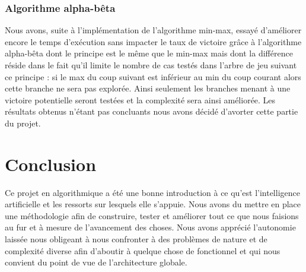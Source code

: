 \documentclass{report}
\begin{document}
\subsection{Algorithme alpha-bêta} \label{alphabeta}
Nous avons, suite à l'implémentation de l'algorithme min-max, essayé d'améliorer encore le temps d'exécution sans impacter le taux de victoire grâce à l'algorithme alpha-bêta dont le principe est le même que le min-max mais dont la différence réside dans le fait qu'il limite le nombre de cas testés dans l'arbre de jeu suivant ce principe : si le max du coup suivant est inférieur au min du coup courant alors cette branche ne sera pas explorée. Ainsi seulement les branches menant à une victoire potentielle seront testées et la complexité sera ainsi améliorée.
Les résultats obtenus n'étant pas concluants nous avons décidé d'avorter cette partie du projet. 


\chapter*{Conclusion}
Ce projet en algorithmique a été une bonne introduction à ce qu'est l'intelligence artificielle et les ressorts sur lesquels elle s'appuie.
Nous avons du mettre en place une méthodologie afin de construire, tester et améliorer tout ce que nous faisions au fur et à mesure de l'avancement des choses.
Nous avons apprécié l'autonomie laissée nous obligeant à nous confronter à des problèmes de nature et de complexité diverse afin d'aboutir à quelque chose de fonctionnel
et qui nous convient du point de vue de l'architecture globale.
\end{document}

